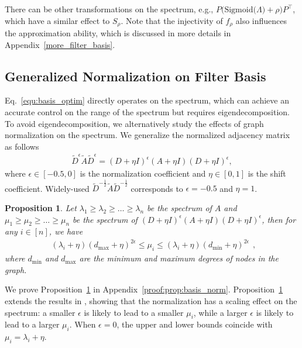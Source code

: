 \documentclass[nohyperref]{article}
\theoremstyle{plain}
\newtheorem{proposition}[theorem]{Proposition}
\theoremstyle{definition}
\theoremstyle{remark}
\begin{document}
There can be other transformations on the spectrum, e.g., $P\bigl(\mathrm{Sigmoid}\bigl(\Lambda\bigr)+\rho\bigr)P^{\top}$, which have a similar effect to $S_{\rho}$.
Note that the injectivity of $f_{\rho}$ also influences the approximation ability, which is discussed in more details in Appendix~\ref{more_filter_basis}.


\subsection{Generalized Normalization on Filter Basis}

Eq.~\ref{equ:basis_optim} directly operates on the spectrum, which can achieve an accurate control on the range of the spectrum but requires eigendecomposition.
To avoid eigendecomposition, we alternatively study the effects of graph normalization on the spectrum.
We generalize the normalized adjacency matrix as follows
\begin{equation}
	\label{equ:basis_norm}
	\begin{aligned}
		\tilde{D}^{\epsilon}\tilde{A}\tilde{D}^{\epsilon}=(D+\eta I)^{\epsilon}(A+\eta I)(D+\eta I)^{\epsilon},
	\end{aligned}
\end{equation}
where $\epsilon\in[-0.5, 0]$ is the normalization coefficient and $\eta\in[0, 1]$ is the shift coefficient.
Widely-used $\tilde D^{-\frac{1}{2}}\tilde A\tilde D^{-\frac{1}{2}}$ corresponds to $\epsilon=-0.5$ and $\eta=1$.

\begin{proposition}
	\label{prop:basis_norm}
	Let $\lambda_1\geq\lambda_2\geq\dots\geq\lambda_n$ be the spectrum of $A$ and $\mu_1\geq\mu_2\geq\dots\geq\mu_n$ be the spectrum of $(D+\eta I)^{\epsilon}(A+\eta I)(D+\eta I)^{\epsilon}$, then for any $i\in[n]$, we have
	\begin{equation}
		\nonumber
		\begin{aligned}
			(\lambda_i+\eta)(d_{\mathrm{max}}+\eta)^{2\epsilon}\leq\mu_i\leq(\lambda_i+\eta)(d_{\mathrm{min}}+\eta)^{2\epsilon}
		\end{aligned},
	\end{equation}
	where $d_{\mathrm{min}}$ and $d_{\mathrm{max}}$ are the minimum and maximum degrees of nodes in the graph.
\end{proposition}
We prove Proposition~\ref{prop:basis_norm} in Appendix~\ref{proof:prop:basis_norm}.
Proposition~\ref{prop:basis_norm} extends the results in \cite{4389477}, showing that the normalization has a scaling effect on the spectrum: a smaller $\epsilon$ is likely to lead to a smaller $\mu_i$,
while a larger $\epsilon$ is likely to lead to a larger $\mu_i$.
When $\epsilon=0$, the upper and lower bounds coincide with $\mu_i=\lambda_i+\eta$.
\end{document}
